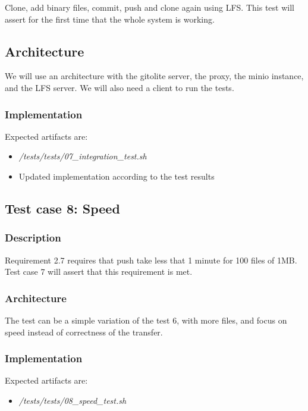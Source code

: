 Clone, add binary files, commit, push and clone again using LFS. This test will assert for the first time that the whole system is working.

\subsection{Architecture}

We will use an architecture with the gitolite server, the proxy, the minio instance, and the LFS server. We will also need a client to run the tests.

\subsubsection{Implementation}

Expected artifacts are:

\begin{itemize}
    \item \textit{/tests/tests/07\_integration\_test.sh}
    \item Updated implementation according to the test results
\end{itemize}

\subsection{Test case 8: Speed}

\subsubsection{Description}

Requirement 2.7 requires that push take less that 1 minute for 100 files of 1MB. Test case 7 will assert that this requirement is met.

\subsubsection{Architecture}

The test can be a simple variation of the test 6, with more files, and focus on speed instead of correctness of the transfer.

\subsubsection{Implementation}

Expected artifacts are:

\begin{itemize}
    \item \textit{/tests/tests/08\_speed\_test.sh}
\end{itemize}
